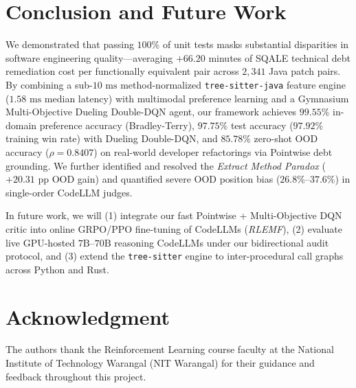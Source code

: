 \documentclass[conference]{IEEEtran}
\begin{document}
\section{Conclusion and Future Work}
\label{sec:conclusion}
We demonstrated that passing $100\%$ of unit tests masks substantial disparities in software engineering quality---averaging $+66.20$ minutes of SQALE technical debt remediation cost per functionally equivalent pair across $2{,}341$ Java patch pairs. By combining a sub-$10\text{ ms}$ method-normalized \texttt{tree-sitter-java} feature engine ($1.58\text{ ms}$ median latency) with multimodal preference learning and a Gymnasium Multi-Objective Dueling Double-DQN agent, our framework achieves $99.55\%$ in-domain preference accuracy (Bradley-Terry), $97.75\%$ test accuracy ($97.92\%$ training win rate) with Dueling Double-DQN, and $85.78\%$ zero-shot OOD accuracy ($\rho=0.8407$) on real-world developer refactorings via Pointwise debt grounding. We further identified and resolved the \textit{Extract Method Paradox} ($+20.31\text{ pp}$ OOD gain) and quantified severe OOD position bias ($26.8\%\text{--}37.6\%$) in single-order CodeLLM judges.

In future work, we will (1) integrate our fast Pointwise + Multi-Objective DQN critic into online GRPO/PPO fine-tuning of CodeLLMs (\textit{RLEMF}), (2) evaluate live GPU-hosted $7\text{B}\text{--}70\text{B}$ reasoning CodeLLMs under our bidirectional audit protocol, and (3) extend the \texttt{tree-sitter} engine to inter-procedural call graphs across Python and Rust.

\section*{Acknowledgment}
The authors thank the Reinforcement Learning course faculty at the National Institute of Technology Warangal (NIT Warangal) for their guidance and feedback throughout this project.

\balance


\end{document}
